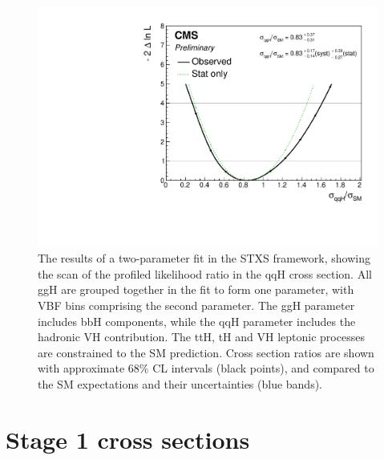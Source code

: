 \begin{figure}[hptb]
\centering
\includegraphics[width=\textwidth]{Figures/Results/ObsStage0_r_qqH.pdf}
\caption{
  The results of a two-parameter fit in the STXS framework,
  showing the scan of the profiled likelihood ratio in the qqH cross section.
  All ggH are grouped together in the fit to form one parameter, 
  with VBF bins comprising the second parameter.
  The ggH parameter includes bbH components, 
  while the qqH parameter includes the hadronic VH contribution. 
  The ttH, tH and VH leptonic processes are constrained to the SM prediction. 
  Cross section ratios are shown with approximate 68\% CL intervals (black points), 
  and compared to the SM expectations and their uncertainties (blue bands).
}
\label{fig:results_Stage0_qqH}
\end{figure}

\section{Stage 1 cross sections}

